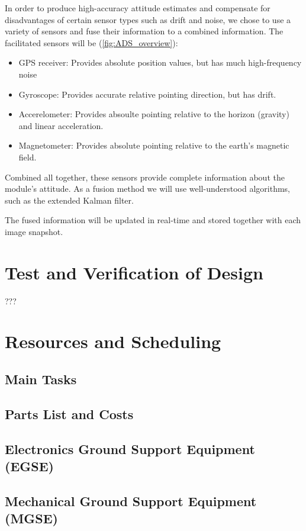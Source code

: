 \documentclass[fontsize=11pt,paper=a4,]{scrartcl}
\begin{document}
In order to produce high-accuracy attitude estimates and compensate for disadvantages of certain sensor types such as drift and noise, we chose to use a variety of sensors and fuse their information to a combined information.
The facilitated sensors will be (\ref{fig:ADS_overview}):
\begin{itemize}
\item GPS receiver: Provides absolute position values, but has much high-frequency noise
\item Gyroscope: Provides accurate relative pointing direction, but has drift.
\item Accerelometer: Provides absoulte pointing relative to the horizon (gravity) and linear acceleration.
\item Magnetometer: Provides absolute pointing relative to the earth's magnetic field.
\end{itemize}

Combined all together, these sensors provide complete information about the module's attitude.
As a fusion method we will use well-understood algorithms, such as the extended Kalman filter.

The fused information will be updated in real-time and stored together with each image snapshot.



\section{Test and Verification of Design}
???


\section{Resources and Scheduling}
\subsection{Main Tasks}
\subsection{Parts List and Costs}
\subsection{Electronics Ground Support Equipment (EGSE)}
\subsection{Mechanical Ground Support Equipment (MGSE)}
\end{document}
